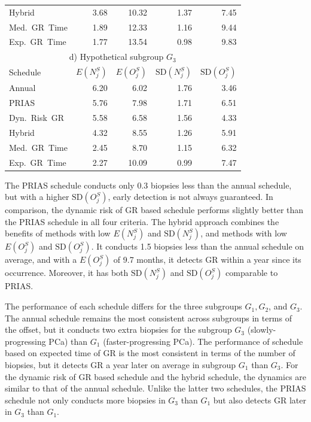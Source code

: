 \begin{table}
\begin{tabular}{lrrrr}
Hybrid       & 3.68            & 10.32                & 1.37          & 7.45              \\
Med.~GR~Time & 1.89             & 12.33               & 1.16          & 9.44              \\
Exp.~GR~Time & 1.77            & 13.54               & 0.98          & 9.83              \\
\midrule    
\multicolumn{5}{c}{d) Hypothetical subgroup $G_3$}\\
\midrule
Schedule        & $E(N^S_j)$ & $E(O^S_j)$ & ${\mbox{SD}(N^S_j)}$ & ${\mbox{SD}(O^S_j)}$ \\
\midrule
Annual         & 6.20             & 6.02                & 1.76          & 3.46              \\
PRIAS          & 5.76             & 7.98                & 1.71         & 6.51        \\
Dyn.~Risk~GR       & 5.58            & 6.58                & 1.56          & 4.33              \\
Hybrid       & 4.32            & 8.55                & 1.26          & 5.91              \\
Med.~GR~Time & 2.45            & 8.70                & 1.15          & 6.32              \\
Exp.~GR~Time & 2.27            & 10.09               & 0.99          & 7.47              \\
\bottomrule    
\end{tabular}
\end{table}

The PRIAS schedule conducts only 0.3 biopsies less than the annual schedule, but with a higher $\mbox{SD}(O^S_j)$, early detection is not always guaranteed. In comparison, the dynamic risk of GR based schedule performs slightly better than the PRIAS schedule in all four criteria. The hybrid approach combines the benefits of methods with low $E(N^S_j)$ and $\mbox{SD}(N^S_j)$, and methods with low $E(O^S_j)$ and $\mbox{SD}(O^S_j)$. It conducts 1.5 biopsies less than the annual schedule on average, and with a $E(O^S_j)$ of 9.7 months, it detects GR within a year since its occurrence. Moreover, it has both $\mbox{SD}(N^S_j)$ and $\mbox{SD}(O^S_j)$ comparable to PRIAS.

The performance of each schedule differs for the three subgroups $G_1, G_2$, and $G_3$. The annual schedule remains the most consistent across subgroups in terms of the offset, but it conducts two extra biopsies for the subgroup $G_3$ (slowly-progressing PCa) than $G_1$ (faster-progressing PCa). The performance of schedule based on expected time of GR is the most consistent in terms of the number of biopsies, but it detects GR a year later on average in subgroup $G_1$ than $G_3$. For the dynamic risk of GR based schedule and the hybrid schedule, the dynamics are similar to that of the annual schedule. Unlike the latter two schedules, the PRIAS schedule not only conducts more biopsies in $G_3$ than $G_1$ but also detects GR later in $G_3$ than $G_1$.

